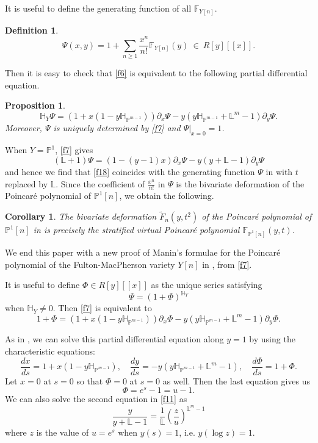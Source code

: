 \documentclass[11pt]{amsart}
\newtheorem{proposition}[theorem]{Proposition}
\newtheorem{corollary}[theorem]{Corollary}
\newtheorem{definition}[theorem]{Definition}
\newcommand{\PP}{\mathbb{P}}
\def\LL{\mathbb{L}}
\def\beq{\begin{equation}}
\def\eeq{\end{equation}}
\def\HH{\mathbb{H}}
\def\FF{\mathbb{F}}
\begin{document}
\medskip

It is useful to define the generating function of all $\FF_{Y[n]}$. 
\begin{definition}
\beq\label{f18} \Psi(x,y)=1+\sum_{n\ge 1}\frac{x^n}{n!}\FF_{Y[n]}(y)\  \in \ R[y][\![x]\!].\eeq
\end{definition}
Then it is easy to check that \eqref{f6} is equivalent to the following partial differential equation.
\begin{proposition}
\beq\label{f7}
\HH_Y\Psi=(1+x(1-y\HH_{\PP^{m-1}}))\partial_x\Psi - y(y\HH_{\PP^{m-1}}+{\LL^m}-1)\partial_y\Psi.
\eeq
Moreover, $\Psi$ is uniquely determined by \eqref{f7} and $\Psi|_{x=0}=1$. 
\end{proposition}

When $Y=\PP^1$, \eqref{f7} gives 
$$(\LL+1)\Psi=(1-(y-1)x)\partial_x\Psi-y(y+\LL-1)\partial_y\Psi$$
and hence we find that \eqref{f18} coincides with the generating function $\Psi$ in \cite[\S5]{BercziKiem2026} with $t$ replaced by $\LL$. %
Since the coefficient of $\frac{x^n}{n!}$ in $\Psi$ is the bivariate deformation of the Poincar\'e polynomial of $\PP^1[n]$, we obtain the following.
\begin{corollary}\label{f21}
  The bivariate deformation $\widetilde{F}_n(y,t^2)$ of the Poincar\'e polynomial of $\PP^1[n]$ in \cite{BercziKiem2026} is precisely the stratified virtual Poincar\'e polynomial $\FF_{\PP^1[n]}(y,t)$.   
\end{corollary}

We end this paper with a new proof of Manin's formulae for the Poincar\'e polynomial of the Fulton-MacPherson variety $Y[n]$ in \cite{Manin1999}, from \eqref{f7}.

It is useful to define $\Phi\in R[y][\![x]\!]$ as the unique series satisfying
$$\Psi=(1+\Phi)^{\HH_Y}$$
when $\HH_Y\ne 0$.  
Then \eqref{f7} is equivalent to 
\beq\label{f9}
1+\Phi = (1+x(1-y\HH_{\PP^{m-1}}))\partial_x\Phi - y(y\HH_{\PP^{m-1}}+{\LL^m}-1)\partial_y\Phi.
\eeq

As in \cite{BercziKiem2026}, we can solve this partial differential equation along $y=1$ by using the characteristic equations: 
\beq\label{f11} \frac{dx}{ds}=1+x(1-y\HH_{\PP^{m-1}}),\quad \frac{dy}{ds}=- y(y\HH_{\PP^{m-1}}+{\LL^m}-1),\quad \frac{d\Phi}{ds}=1+\Phi.\eeq
Let $x=0$ at $s=0$ so that $\Phi=0$ at $s=0$ as well. Then the last equation gives us 
\beq\label{f10}
\Phi=e^s-1=u-1.\eeq
We can also solve the second equation in \eqref{f11} as
\beq\label{f12}
\frac{y}{y+\LL-1} = \frac{1}{\LL} \left( \frac{z}{u} \right)^{\LL^m-1}\eeq
where $z$ is the value of $u=e^s$ when $y(s)=1$, i.e. $y(\log z)=1$. 
\end{document}
